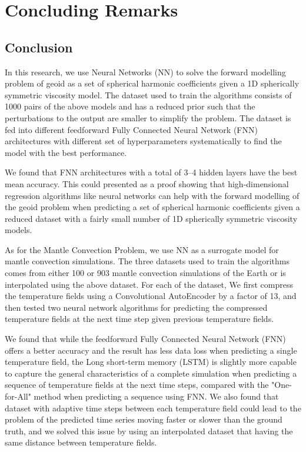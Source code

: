 \chapter{Concluding Remarks}\label{chap:conclusion}

\section{Conclusion}

In this research, we use Neural Networks (NN) to solve the forward modelling problem of geoid as a set of spherical harmonic coefficients given a 1D spherically symmetric viscosity model. The dataset used to train the algorithms consists of 1000 pairs of the above models and has a reduced prior such that the perturbations to the output are smaller to simplify the problem. The dataset is fed into different feedforward Fully Connected Neural Network (FNN) architectures with different set of hyperparameters systematically to find the model with the best performance. 

We found that FNN architectures with a total of 3–4 hidden layers have the best mean accuracy. This could presented as a proof showing that high-dimensional regression algorithms like neural networks can help with the forward modelling of the geoid problem when predicting a set of spherical harmonic coefficients given a reduced dataset with a fairly small number of
1D spherically symmetric viscosity models.

As for the Mantle Convection Problem, we use NN as a surrogate model for mantle convection simulations. The three datasets used to train the algorithms comes from either 100 or 903 mantle convection simulations of the Earth or is interpolated using the above dataset. For each of the dataset, We first compress the temperature fields using a Convolutional AutoEncoder by a factor of 13, and then tested two neural network algorithms for predicting the compressed temperature fields at the next time step given previous temperature fields. 

We found that while the feedforward Fully Connected Neural Network (FNN) offers a better accuracy and the result has less data loss when predicting a single temperature field, the Long short-term memory (LSTM) is slightly more capable to capture the general characteristics of a complete simulation when predicting a sequence of temperature fields at the next time steps, compared with the "One-for-All" method when predicting a sequence using FNN. We also found that dataset with adaptive time steps between each temperature field could lead to the problem of the predicted time series moving faster or slower than the ground truth, and we solved this issue by using an interpolated dataset that having the same distance between temperature fields.

